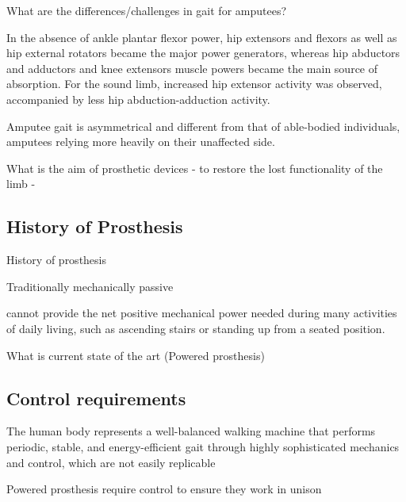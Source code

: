 What are the differences/challenges in gait for amputees? 

In the absence of ankle plantar flexor power, hip extensors and flexors as well as hip external rotators became the major power generators, whereas hip abductors and adductors and knee extensors muscle powers became the main source of absorption. For the sound limb, increased hip extensor activity was observed, accompanied by less hip abduction-adduction activity.\cite{Sadeghi2001}

Amputee gait is asymmetrical and different from that of able-bodied individuals, amputees relying more heavily on their unaffected side.\cite{Bateni2002, Varrecchia2019}

What is the aim of prosthetic devices - to restore the lost functionality of the limb - \cite{Tucker2015}


\subsection{History of Prosthesis}
History of prosthesis

Traditionally mechanically passive

cannot provide the net positive mechanical power needed during many activities of daily living, such as ascending stairs or standing up from a seated position\cite{Simon2013}.

What is current state of the art (Powered prosthesis)



\subsection{Control requirements} %
The human body represents a well-balanced walking machine that performs periodic, stable, and energy-efficient gait through highly sophisticated mechanics and control, which are not easily replicable\cite{Mummolo2013}

Powered prosthesis require control to ensure they work in unison

